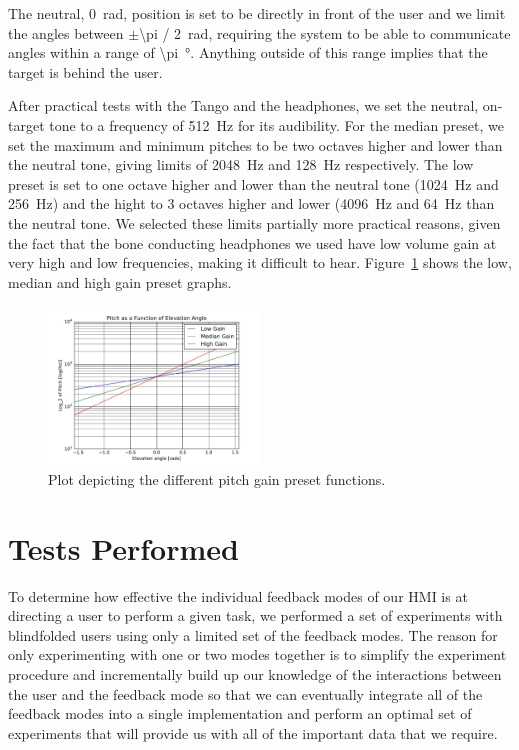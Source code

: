 \documentclass[format=sigconf, review=true, screen=true, anonymous=true]{acmart}
\begin{document}
The neutral, \SI{0}{\radian}, position is set to be directly in front of the user and we limit the angles between $\pm$\SI[quotient-mode=fraction]{\pi / 2}{\radian}, requiring the system to be able to communicate angles within a range of \SI{\pi}{\degree}. Anything outside of this range implies that the target is behind the user. 

After practical tests with the Tango and the headphones, we set the neutral, on-target tone to a frequency of \SI{512}{\hertz} for its audibility. For the median preset, we set the maximum and minimum pitches to be two octaves higher and lower than the neutral tone, giving limits of \SI{2048}{\hertz} and \SI{128}{\hertz} respectively. The low preset is set to one octave higher and lower than the neutral tone (\SI{1024}{\hertz} and \SI{256}{\hertz}) and the hight to 3 octaves higher and lower (\SI{4096}{\hertz} and \SI{64}{\hertz} than the neutral tone. We selected these limits partially more practical reasons, given the fact that the bone conducting headphones we used have low volume gain at very high and low frequencies, making it difficult to hear. Figure~\ref{fig:pitch-preset-plot} shows the low, median and high gain preset graphs.  

\begin{figure}
  \centering
  \includegraphics[width=0.5\textwidth]{figures/pitch_gradient.pdf}
  \caption{Plot depicting the different pitch gain preset functions.}
  \label{fig:pitch-preset-plot}
\end{figure}

\section{Tests Performed}

To determine how effective the individual feedback modes of our HMI is at directing a user to perform a given task, we performed a set of experiments with blindfolded users using only a limited set of the feedback modes. The reason for only experimenting with one or two modes together is to simplify the experiment procedure and incrementally build up our knowledge of the interactions between the user and the feedback mode so that we can eventually integrate all of the feedback modes into a single implementation and perform an optimal set of experiments that will provide us with all of the important data that we require. 
\end{document}
